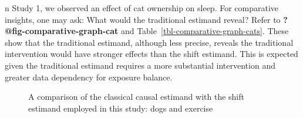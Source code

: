 \documentclass[
  singlecolumn,
  9pt]{article}
\begin{document}
n Study 1, we observed an effect of cat ownership on sleep. For
comparative insights, one may ask: What would the traditional estimand
reveal? Refer to \textbf{?@fig-comparative-graph-cat} and
Table~\ref{tbl-comparative-graph-cats}. These show that the traditional
estimand, although less precise, reveals the traditional intervention
would have stronger effects than the shift estimand. This is expected
given the traditional estimand requires a more substantial intervention
and greater data dependency for exposure balance.

\begin{figure}


\caption{\label{fig-comparative-graph-dogs}A comparison of the classical
causal estimand with the shift estimand employed in this study: dogs and
exercise}

\end{figure}%
\end{document}
